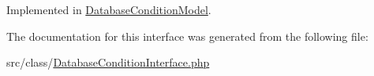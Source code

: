 Implemented in \hyperlink{class_database_condition_model_a170962f6550bf5cefcf4a871dcebc25e}{Database\+Condition\+Model}.



The documentation for this interface was generated from the following file\+:\begin{DoxyCompactItemize}
\item 
src/class/\hyperlink{_database_condition_interface_8php}{Database\+Condition\+Interface.\+php}\end{DoxyCompactItemize}
